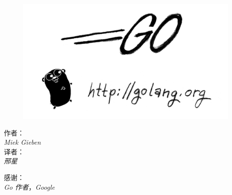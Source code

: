 \documentclass[a4paper,twoside,openleft]{blocksbook}
\begin{document}
\thispagestyle{empty}
\newcommand{\version}{1.0}
\strictpagecheck

\begin{center}
\\
\end{center}
\vspace*{2cm}
\begin{figure}[h!]
\begin{center}
    \includegraphics[scale=0.65]{fig/bumper-inverse.png}
\end{center}
\end{figure}
\vspace*{0.02\stockheight}
\begin{minipage}{0.4\textwidth}
\begin{flushleft} \large
\hspace*{2,0cm}作者：\\
\hspace*{2.0cm}\emph{Miek Gieben}\\
\hspace*{2.0cm}译者：\\
\hspace*{2.0cm}\emph{邢星}\\
\vfill
\end{flushleft}
\end{minipage}
\hspace{5mm}
\begin{minipage}{0.4\textwidth}
\begin{flushright} \large
感谢：\\
\emph{Go 作者}，\emph{Google}\\
\vfill
\end{flushright}
\end{minipage}
\end{document}
